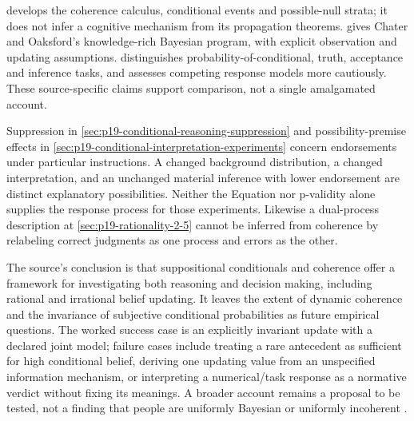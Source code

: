  develops the coherence calculus, conditional
events and possible-null strata; it does not infer a cognitive mechanism
from its propagation theorems.  gives
Chater and Oaksford's knowledge-rich Bayesian program, with explicit
observation and updating assumptions. 
distinguishes probability-of-conditional, truth, acceptance and inference
tasks, and assesses competing response models more cautiously. These
source-specific claims support comparison, not a single amalgamated account.

Suppression in \cref{sec:p19-conditional-reasoning-suppression} and
possibility-premise effects in
\cref{sec:p19-conditional-interpretation-experiments} concern endorsements
under particular instructions. A changed background distribution, a
changed interpretation, and an unchanged material inference with lower
endorsement are distinct explanatory possibilities. Neither the Equation
nor p-validity alone supplies the response process for those experiments.
Likewise a dual-process description at \cref{sec:p19-rationality-2-5}
cannot be inferred from coherence by relabeling correct judgments as one
process and errors as the other.

The source's conclusion is that suppositional conditionals and coherence
offer a framework for investigating both reasoning and decision making,
including rational and irrational belief updating. It leaves the extent
of dynamic coherence and the invariance of subjective conditional
probabilities as future empirical questions. The worked success case is
an explicitly invariant update with a declared joint model; failure cases
include treating a rare antecedent as sufficient for high conditional
belief, deriving one updating value from an unspecified information
mechanism, or interpreting a numerical/task response as a normative
verdict without fixing its meanings. A broader account remains a proposal
to be tested, not a finding that people are uniformly Bayesian or
uniformly incoherent \cite[pp.~399--401]{OverCruz2021Suppositional}.
